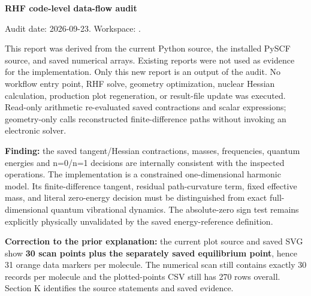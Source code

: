 \documentclass[10pt,a4paper]{article}
\begin{document}
\RaggedRight

{\Huge\sffamily\bfseries\color{accent} RHF code-level data-flow audit\par}
\vspace{8pt}
Audit date: 2026-09-23. Workspace: .

This report was derived from the current Python source, the installed PySCF source, and saved numerical arrays. Existing reports were not used as evidence for the implementation. Only this new report is an output of the audit. No workflow entry point, RHF solve, geometry optimization, nuclear Hessian calculation, production plot regeneration, or result-file update was executed. Read-only arithmetic re-evaluated saved contractions and scalar expressions; geometry-only calls reconstructed finite-difference paths without invoking an electronic solver.

\textbf{Finding:} the saved tangent/Hessian contractions, masses, frequencies, quantum energies and n=0/n=1 decisions are internally consistent with the inspected operations. The implementation is a constrained one-dimensional harmonic model. Its finite-difference tangent, residual path-curvature term, fixed effective mass, and literal zero-energy decision must be distinguished from exact full-dimensional quantum vibrational dynamics. The absolute-zero sign test remains explicitly physically unvalidated by the saved energy-reference definition.

\textbf{Correction to the prior explanation:} the current plot source and saved SVG show \textbf{30 scan points plus the separately saved equilibrium point}, hence 31 orange data markers per molecule. The numerical scan still contains exactly 30 records per molecule and the plotted-points CSV still has 270 rows overall. Section K identifies the source statements and saved evidence.

\clearpage
\tableofcontents
\clearpage
\end{document}
